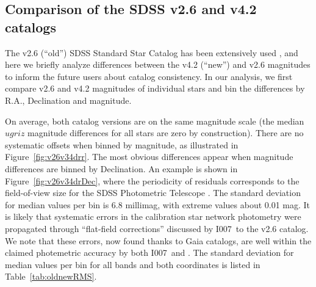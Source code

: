 \documentclass[fleqn,usenatbib]{mnras}
\newcommand{\pO}{\hbox{I007}}
\begin{document}

\subsection{Comparison of the SDSS v2.6 and v4.2 catalogs \label{sec:v26v34}} 

The v2.6 (``old'') SDSS Standard Star Catalog has been extensively used 
\citep[e.g.,][]{2008AJ....135..338F},
and here we briefly analyze differences between the v4.2 (``new'') and v2.6 magnitudes
to inform the future users about catalog consistency. 
In our analysis, we first compare v2.6 and v4.2 magnitudes of individual stars and 
bin the differences by R.A., Declination and magnitude. 

On average, both catalog versions are on the same magnitude scale (the median $ugriz$ 
magnitude differences for all stars are zero by construction). There are no systematic offsets 
when binned by magnitude, as illustrated in Figure~\ref{fig:v26v34drr}. The most obvious 
differences appear when magnitude differences are binned by Declination. An example is 
shown in Figure~\ref{fig:v26v34drDec}, where the periodicity of residuals corresponds to the 
field-of-view size for the SDSS Photometric Telescope \citep{2006AN....327..821T}. 
The standard deviation for median values per bin is 6.8 millimag, with extreme values about 
0.01 mag. It is likely that systematic errors in the calibration star network photometry 
were propagated through ``flat-field corrections'' discussed by \pO\ to the v2.6 catalog.
We note that these errors, now found thanks to Gaia catalogs, are well within the claimed
photemetric accuracy by both \pO\ and \cite{2002AJ....123.2121S}. The standard deviation 
for median values per bin for all bands and both coordinates is listed in Table~\ref{tab:oldnewRMS}. 


   
\end{document}
